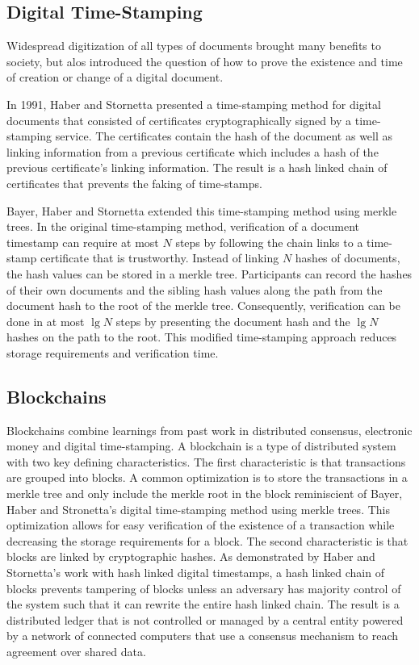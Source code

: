 \subsection{Digital Time-Stamping}

Widespread digitization of all types of documents brought many benefits to
society, but alos introduced the question of how to prove the existence and time of creation or change of a
digital document.

In 1991, Haber and Stornetta presented a time-stamping method for digital
documents that consisted of certificates cryptographically signed by a time-stamping service. The
certificates contain the hash of the document as well as linking information from a
previous certificate which includes a hash of the previous certificate's linking
information\cite{haber1991}. The result is a hash linked chain of certificates
that prevents the faking of time-stamps.

Bayer, Haber and Stornetta extended this time-stamping method using merkle
trees. In the original time-stamping method, verification of a document
timestamp can require at most $N$ steps by following the chain links to a
time-stamp certificate that is trustworthy\cite{bayer1993}. Instead of linking $N$
hashes of documents, the hash values can be stored in a merkle tree.
Participants can record the hashes of their own documents and the sibling hash
values along the path from the document hash to the root of the merkle tree.
Consequently, verification can be done in at most $\lg N$ steps by presenting the
document hash and the $\lg N$ hashes on the path to the root. This modified
time-stamping approach reduces storage requirements and verification time.

\subsection{Blockchains}

Blockchains combine learnings from past work in distributed consensus,
electronic money and digital time-stamping. A blockchain is a type of distributed system with two key defining
characteristics. The first characteristic is that transactions are grouped into blocks. A
common optimization is to store the transactions in a merkle tree and only
include the merkle root in the block reminiscient of Bayer, Haber and
Stronetta's digital time-stamping method using merkle trees. This optimization
allows for easy verification of the existence of a transaction while decreasing
the storage requirements for a block. The second characteristic is that blocks
are linked by cryptographic hashes. As demonstrated by Haber and Stornetta's
work with hash linked digital timestamps, a hash linked chain of blocks prevents
tampering of blocks unless an adversary has majority control of the system such
that it can rewrite the entire hash linked chain. The result is a distributed ledger that is not controlled or managed by a
central entity powered by a network of connected computers that use a consensus
mechanism to reach agreement over shared data\cite{whatisblockchain}.

